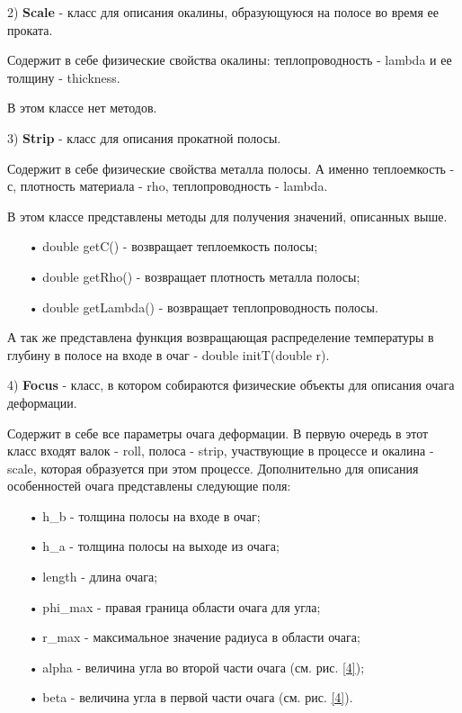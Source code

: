 2) \textbf{Scale} - класс для описания окалины, образующуюся на полосе во время ее проката.

Содержит в себе физические свойства окалины: теплопроводность - lambda и ее толщину - thickness.

В этом классе нет методов.

3) \textbf{Strip} - класс для описания прокатной полосы.

Содержит в себе физические свойства металла полосы. А именно теплоемкость - с, плотность материала - rho, теплопроводность - lambda.

В этом классе представлены методы для получения значений, описанных выше.
\begin{itemize}
\item[•] double getC() - возвращает теплоемкость полосы;
\item[•] double getRho() - возвращает плотность металла полосы;
\item[•] double getLambda() - возвращает теплопроводность полосы.
\end{itemize}

А так же представлена функция возвращающая распределение температуры в глубину в полосе на входе в очаг - double initT(double r).

4) \textbf{Focus} - класс, в котором собираются физические объекты для описания очага деформации.

Содержит в себе все параметры очага деформации. В первую очередь в этот класс входят валок - roll, полоса - strip, участвующие в процессе и окалина - scale, которая образуется при этом процессе. Дополнительно для описания особенностей очага представлены следующие поля:
\begin{itemize}
\item[•] h\_b - толщина полосы на входе в очаг;
\item[•] h\_a - толщина полосы на выходе из очага;
\item[•] length - длина очага;
\item[•] phi\_max - правая граница области очага для угла;
\item[•] r\_max - максимальное значение радиуса в области очага;
\item[•] alpha - величина угла во второй части очага (см. рис. \ref{4});
\item[•] beta - величина угла в первой части очага (см. рис. \ref{4}).
\end{itemize}

